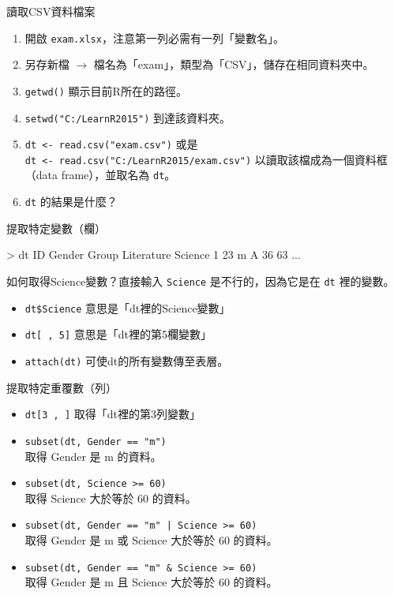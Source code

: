 \documentclass[12pt, aspectratio=43]{beamer}
\begin{document}
\begin{frame}[fragile]{讀取CSV資料檔案}
\begin{enumerate}
\item 開啟 \verb+exam.xlsx+，注意第一列必需有一列「變數名」。
\item 另存新檔 $\rightarrow$ 檔名為「exam」，類型為「CSV」，儲存在相同資料夾中。
\item \verb+getwd()+ 顯示目前R所在的路徑。
\item \verb+setwd("C:/LearnR2015")+ 到達該資料夾。
\item \verb+dt <- read.csv("exam.csv")+ 或是 \\
      \verb+dt <- read.csv("C:/LearnR2015/exam.csv")+ 以讀取該檔成為一個資料框（data frame），並取名為 \verb+dt+。\\
\item \verb+dt+ 的結果是什麼？
\end{enumerate}
\end{frame}


\begin{frame}[fragile]{提取特定變數（欄）}
\begin{R}
> dt
  ID Gender Group Literature Science
1 23      m     A         36      63
...
\end{R}

如何取得Science變數？直接輸入 \verb+Science+ 是不行的，因為它是在 \verb+dt+ 裡的變數。
\begin{itemize}
\item \verb+dt$Science+ 意思是「dt裡的Science變數」
\item \verb+dt[ , 5]+ 意思是「dt裡的第5欄變數」
\item \verb+attach(dt)+ 可使dt的所有變數傳至表層。
\end{itemize}
\end{frame}


\begin{frame}[fragile]{提取特定重覆數（列）}
\begin{itemize}
\item \verb+dt[3 , ]+ 取得「dt裡的第3列變數」
\item \verb+subset(dt, Gender == "m")+ \\ 取得 Gender 是 m 的資料。
\item \verb+subset(dt, Science >= 60)+ \\ 取得 Science 大於等於 60 的資料。
\item \verb+subset(dt, Gender == "m" | Science >= 60)+ \\ 取得 Gender 是 m \alert{或} Science 大於等於 60 的資料。
\item \verb+subset(dt, Gender == "m" & Science >= 60)+ \\ 取得 Gender 是 m \alert{且} Science 大於等於 60 的資料。
\end{itemize}
\end{frame}
\end{document}
